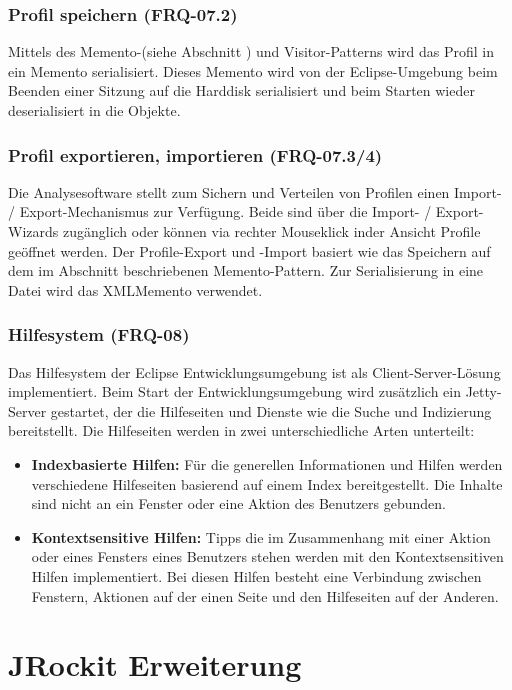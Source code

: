 \subsubsection{Profil speichern (FRQ-07.2)}
Mittels des Memento-(siehe Abschnitt ) und Visitor-Patterns\cite[S. 331]{gamma1995design} wird das Profil in ein Memento serialisiert. Dieses Memento wird von der Eclipse-Umgebung beim Beenden einer Sitzung auf die Harddisk serialisiert und beim Starten wieder deserialisiert in die Objekte.

\subsubsection{Profil exportieren, importieren (FRQ-07.3/4)}
Die Analysesoftware stellt zum Sichern und Verteilen von Profilen einen Import- / Export-Mechanismus zur Verfügung. Beide sind über die Import- / Export-Wizards zugänglich oder können via rechter Mouseklick inder Ansicht Profile geöffnet werden. Der Profile-Export und -Import basiert wie das Speichern auf dem im Abschnitt  beschriebenen Memento-Pattern. Zur Serialisierung in eine Datei wird das XMLMemento verwendet. 

\subsubsection{Hilfesystem (FRQ-08)}
Das Hilfesystem der Eclipse Entwicklungsumgebung ist als Client-Server-Lösung implementiert. Beim Start der Entwicklungsumgebung wird zusätzlich ein Jetty-Server gestartet, der die Hilfeseiten und Dienste wie die Suche und Indizierung bereitstellt. Die Hilfeseiten werden in zwei unterschiedliche Arten unterteilt:
\begin{itemize}
\item \textbf{Indexbasierte Hilfen:} Für die generellen Informationen und Hilfen werden verschiedene Hilfeseiten basierend auf einem Index bereitgestellt. Die Inhalte sind nicht an ein Fenster oder eine Aktion des Benutzers gebunden. 
\item \textbf{Kontextsensitive Hilfen:} Tipps die im Zusammenhang mit einer Aktion oder eines Fensters eines Benutzers stehen werden mit den Kontextsensitiven Hilfen implementiert. Bei diesen Hilfen besteht eine Verbindung zwischen Fenstern, Aktionen auf der einen Seite und den Hilfeseiten auf der Anderen.
\end{itemize}



\section{JRockit Erweiterung}
